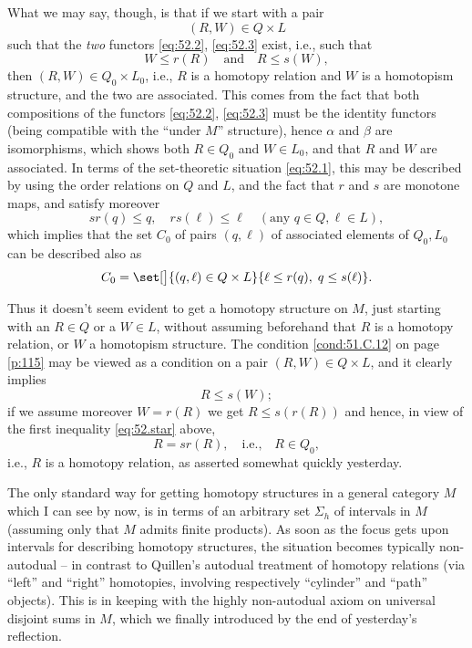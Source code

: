 What we may say, though, is that if we start with a pair
\[(R,W) \in Q\times L\]
such that the \emph{two} functors \eqref{eq:52.2}, \eqref{eq:52.3}
exist, i.e., such that
\[ W\le r(R)\quad\text{and}\quad R\le s(W),\]
then $(R,W)\in Q_0\times L_0$, i.e., $R$ is a homotopy relation and
$W$ is a homotopism structure, and the two are
associated. This comes from the fact that both compositions of the
functors \eqref{eq:52.2}, \eqref{eq:52.3} must be the identity
functors (being compatible with the ``under $M$'' structure), hence
$\alpha$ and $\beta$ are isomorphisms, which shows both $R\in Q_0$ and
$W\in L_0$, and that $R$ and $W$ are associated. In terms of the
set-theoretic situation \eqref{eq:52.1}, this may be described by
using the order relations on $Q$ and $L$, and the fact that $r$ and
$s$ are monotone maps, and satisfy moreover
\begin{equation}
  \label{eq:52.star}
  sr(q)\le q, \quad rs(\ell)\le\ell\quad (\text{any $q\in Q, \ell\in L$}),
  \tag{*}
\end{equation}
which implies that the set $C_0$ of pairs $(q,\ell)$ of associated
elements of $Q_0,L_0$ can be described also as
\[ C_0 = \set[\big]{(q,\ell)\in Q\times L}{\ell\le r(q),\; q\le
  s(\ell)}.\]

Thus it doesn't seem evident to get a homotopy structure on $M$, just
starting with an $R\in Q$ or a $W\in L$, without assuming beforehand
that $R$ is a homotopy relation, or $W$ a homotopism structure. The
condition \ref{cond:51.C.12} on page \ref{p:115} may be viewed as a
condition on a pair $(R,W)\in Q\times L$, and it clearly implies
\[ R \le s(W);\]
if we assume moreover $W=r(R)$ we get $R\le s(r(R))$ and hence, in
view of the first inequality \eqref{eq:52.star} above,
\[ R = sr(R), \quad\text{i.e.,}\quad R\in Q_0,\]
i.e., $R$ is a homotopy relation, as asserted somewhat quickly
yesterday.

The only standard way for getting homotopy structures in a general
category $M$ which I can see by now, is in terms of an arbitrary set
$\Sigma_h$ of intervals in $M$ (assuming only that $M$ admits finite
products). As soon as the focus gets upon intervals for describing
homotopy structures, the situation becomes typically non-autodual --
in contrast to Quillen's autodual treatment of homotopy relations (via
``left'' and ``right'' homotopies, involving respectively ``cylinder''
and ``path'' objects). This is in keeping with the highly non-autodual
axiom on universal disjoint sums in $M$, which we finally introduced
by the end of yesterday's reflection.

